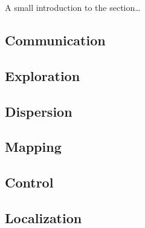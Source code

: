 A small introduction to the section\ldots
    \subsection{Communication}
    
    \subsection{Exploration}
    
    \subsection{Dispersion}
    
    \subsection{Mapping}
    
    \subsection{Control}
    
    \subsection{Localization}
    
